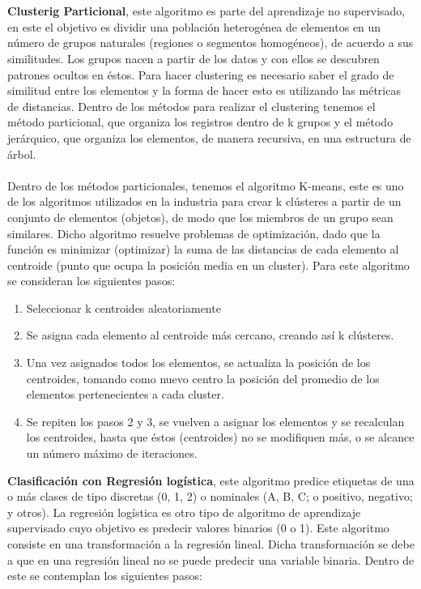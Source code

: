 \documentclass[10pt,a4paper]{article}
\begin{document}
  \\ \\
  \textbf{Clusterig Particional}, este algoritmo es parte del aprendizaje no supervisado, en este el objetivo es dividir una población heterogénea de elementos en un número de grupos naturales (regiones o segmentos homogéneos), de acuerdo a sus similitudes.  Los grupos nacen a partir de los datos y con ellos se descubren patrones ocultos en éstos. Para hacer clustering es necesario saber el grado de similitud entre los elementos y la forma de hacer esto es utilizando las métricas de distancias. Dentro de los métodos para realizar el clustering tenemos el método particional, que organiza los registros dentro de k grupos y el método jerárquico, que organiza los elementos, de manera recursiva, en una estructura de árbol. 
  \\ \\ 
    Dentro de los métodos particionales, tenemos el algoritmo K-means, este es uno de los algoritmos utilizados en la industria para crear k clústeres a partir de un conjunto de elementos (objetos), de modo que los miembros de un grupo sean similares.  Dicho algoritmo resuelve problemas de optimización, dado que la función es minimizar (optimizar) la suma de las distancias de cada elemento al centroide (punto que ocupa la posición media en un cluster). Para este algoritmo se consideran los siguientes pasos: 
    
    \begin{enumerate}
        \item Seleccionar k centroides aleatoriamente
        \item Se asigna cada elemento al centroide más
cercano, creando así k clústeres.
        \item Una vez asignados todos los elementos, se
    actualiza la posición de los centroides, tomando
    como nuevo centro la posición del promedio de los
    elementos pertenecientes a cada cluster.
    \item Se repiten los pasos 2 y 3, se vuelven a
asignar los elementos y se recalculan los
centroides, hasta que éstos (centroides) no se
modifiquen más, o se alcance un número
máximo de iteraciones.
    \end{enumerate}

\textbf{ Clasificación con Regresión logística}, este algoritmo predice etiquetas de una o más clases de tipo discretas (0, 1, 2) o nominales (A, B, C; o positivo, negativo; y otros). La regresión logística es otro tipo de algoritmo de aprendizaje supervisado cuyo objetivo es predecir valores binarios (0 o 1). Este algoritmo consiste en una transformación a la regresión lineal. Dicha transformación se debe a que en una regresión lineal no se puede predecir una variable binaria. Dentro de este se contemplan los siguientes pasos:  
\end{document}
